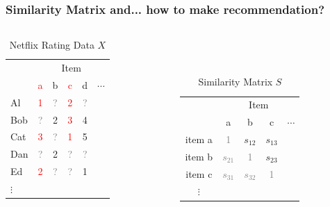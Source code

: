 \documentclass[xcolor={dvipsnames}]{beamer}
\begin{document}
\frame
{
\frametitle{Similarity Matrix and... {{how to make recommendation?}}}


\begin{columns}
\begin{column}{.5\textwidth}


\begin{table}
\begin{tabular}{|l|ccccc|}
\hline
  & \multicolumn{5}{|c|}{Item} \\
    & \textcolor{red}{a} & b & \textcolor{red}{c} & d & $\cdots$ \\ \hline
Al & \textcolor{red}{1} & \textcolor{gray}{?} & \textcolor{red}{2} & \textcolor{gray}{?} &\\
Bob & \textcolor{gray}{?} & 2 & \textcolor{red}{3} & 4 &\\
Cat & \textcolor{red}{3} & \textcolor{gray}{?} & \textcolor{red}{1} & 5&\\
Dan & \textcolor{gray}{?} & 2 & \textcolor{gray}{?} & \textcolor{gray}{?}& \\
Ed & \textcolor{red}{2} &   \textcolor{gray}{?} & \textcolor{gray}{?} & 1&\\
$\vdots$ &&&&&\\ \hline
\end{tabular}
\caption{Netflix Rating Data $X$}
\end{table}


\end{column}
\begin{column}{.5\textwidth}

\vspace{-.4em}
${}$\\${}$\\

\begin{table}
\begin{tabular}{c||c|c|c|c||}
  & \multicolumn{4}{|c||}{Item}  \\
& a &  b &  c & $\cdots$ \\\hline \hline
item a &\textcolor{gray}{1}&$s_{12}$&$s_{13}$& \\ \hline
item b &\textcolor{gray}{$s_{21}$}&\textcolor{gray}{1}&$s_{23}$& \\ \hline
item c &\textcolor{gray}{$s_{31}$}&\textcolor{gray}{$s_{32}$}&\textcolor{gray}{1}& \\ \hline
$\vdots$ &&&& \\ \hline \hline
\end{tabular}
\caption{Similarity Matrix $S$}  
\end{table}

\end{column}
\end{columns}


}
\end{document}

